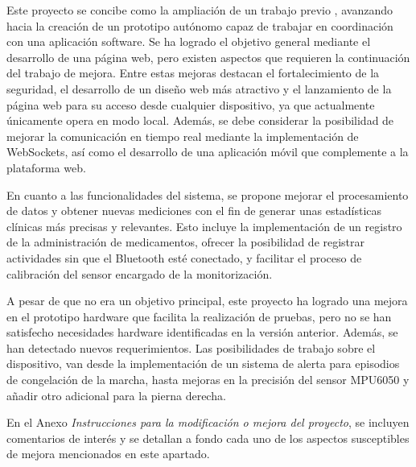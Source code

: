 
Este proyecto se concibe como la ampliación de un trabajo previo \cite{saragonz91:online}, avanzando hacia la creación de un prototipo autónomo capaz de trabajar en coordinación con una aplicación software. Se ha logrado el objetivo general mediante el desarrollo de una página web, pero existen aspectos que requieren la continuación del trabajo de mejora. Entre estas mejoras destacan el fortalecimiento de la seguridad, el desarrollo de un diseño web más atractivo y el lanzamiento de la página web para su acceso desde cualquier dispositivo, ya que actualmente únicamente opera en modo local. Además, se debe considerar la posibilidad de mejorar la comunicación en tiempo real mediante la implementación de WebSockets, así como el desarrollo de una aplicación móvil que complemente a la plataforma web.

En cuanto a las funcionalidades del sistema, se propone mejorar el procesamiento de datos y obtener nuevas mediciones con el fin de generar unas estadísticas clínicas más precisas y relevantes. Esto incluye la implementación de un registro de la administración de medicamentos, ofrecer la posibilidad de registrar actividades sin que el Bluetooth esté conectado, y facilitar el proceso de calibración del sensor encargado de la monitorización.

A pesar de que no era un objetivo principal, este proyecto ha logrado una mejora en el prototipo hardware que facilita la realización de pruebas, pero no se han satisfecho necesidades hardware identificadas en la versión anterior. Además, se han detectado nuevos requerimientos. Las posibilidades de trabajo sobre el dispositivo, van desde la implementación de un sistema de alerta para episodios de congelación de la marcha, hasta mejoras en la precisión del sensor MPU6050 y añadir otro adicional para la pierna derecha.

En el Anexo \textit{Instrucciones para la modificación o mejora del proyecto}, se incluyen comentarios de interés y se detallan a fondo cada uno de los aspectos susceptibles de mejora mencionados en este apartado.